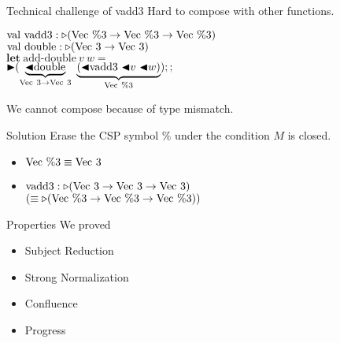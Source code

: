 \documentclass[dvipdfmx,aspectratio=169, 20pt]{beamer}
\begin{document}
\begin{frame}[fragile]{Technical challenge of vadd3}
    Hard to compose with other functions.
    \newcommand{\Vn}{\text{Vec}\ \%n}
    \newcommand{\Vpt}{\text{Vec}\ \%3}
    \newcommand{\Vt}{\text{Vec}\ 3}
    \begin{exampleblock}{}
    \begin{tabbing}
        \hspace{5mm} \= \( \text{val}\ \text{vadd3} : \TW (\Vpt \to \Vpt \to \Vpt) \) \\
        \> \( \text{val}\ \text{double} : \TW (\Vt \to \Vt) \) \\[2mm]
        \> \( \textbf{let}\ \text{add-double}\ v\ w = \) \\
        \> \hspace{5mm} \( \TB (\underbrace{\TBL\text{double}}_{\Vt \to \Vt}\ \underbrace{(\TBL \text{vadd3}\ \TBL v\ \TBL w)}_{\Vpt});; \) \\
    \end{tabbing}
    \end{exampleblock}
    We cannot compose because of type mismatch.
\end{frame}

\begin{frame}[fragile]{Solution}
    \newcommand{\Vt}{\text{Vec}\ 3}
    \newcommand{\Vpt}{\text{Vec}\ \%3}
    Erase the CSP symbol \( \% \) under the condition \(M \) is closed.
    \begin{center}
    \end{center}
    \begin{exampleblock}{}
    \begin{itemize}
        \item \( \text{Vec}\ \%3 \equiv \text{Vec}\ 3 \)
        \item \( \text{vadd3} : \TW (\Vt \to \Vt \to \Vt) \) \\
            \hspace{15mm} \( (\E  \TW (\Vpt \to \Vpt \to \Vpt)) \)
    \end{itemize}
    \end{exampleblock}
\end{frame}

\begin{frame}[fragile]{Properties}
    We proved
    \begin{itemize}
        \item Subject Reduction
        \item Strong Normalization
        \item Confluence
        \item Progress
    \end{itemize}
    \note{
    }
\end{frame}
\end{document}
